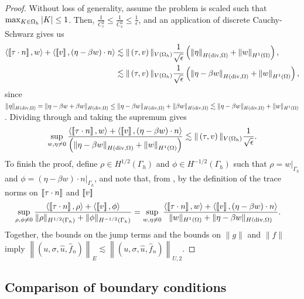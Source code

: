 \begin{proof}
Without loss of generality, assume the problem is scaled such that $\max_{K\in\Oh}|K| \leq 1$. Then, $\frac{1}{C_\tau^2}\leq \frac{1}{C_v^2} \leq \frac{1}{\epsilon}$, and an application of discrete Cauchy-Schwarz gives us 
\begin{align*}
\langle \jump{\tau\cdot n},w\rangle + \langle \jump{v},\left(\eta - \beta w\right)\cdot n\rangle &\lesssim \|\left(\tau,v\right)\|_{V(\Oh)}\frac{1}{\sqrt{\epsilon}}\left(\nor{\eta}_{H({\rm div},\Omega)} + \nor{w}_{H^1(\Omega)}\right),\\
&\lesssim \|\left(\tau,v\right)\|_{V(\Oh)}\frac{1}{\sqrt{\epsilon}}\left(\nor{\eta-\beta w}_{H({\rm div},\Omega)} + \nor{w}_{H^1(\Omega)}\right),
\end{align*}
since $\|\eta\|_{H({\rm div},\Omega)} = \|\eta - \beta w + \beta w\|_{H({\rm div},\Omega)} \leq \|\eta - \beta w\|_{H({\rm div},\Omega)} + \|\beta w\|_{H({\rm div},\Omega)} \lesssim \|\eta-\beta w\|_{H({\rm div},\Omega)} + \|w\|_{H^1(\Omega)}$.  Dividing through and taking the supremum gives
\[
\sup_{w,\eta \neq 0} \frac{\langle\jump{\tau\cdot n},w\rangle + \langle \jump{v},\left(\eta - \beta w\right)\cdot n\rangle}{\left(\nor{\eta-\beta w}_{H({\rm div},\Omega)} + \nor{w}_{H^1(\Omega)}\right)} \lesssim \|\left(\tau,v\right)\|_{V(\Oh)}\frac{1}{\sqrt{\epsilon}}.
\]
To finish the proof, define $\rho \in H^{1/2}(\Gamma_h)$ and $\phi \in H^{-1/2}(\Gamma_h)$ such that $\rho = \left.w\right|_{\Gamma_h}$ and $\phi = \left.(\eta-\beta w)\cdot n\right|_{\Gamma_h}$, and note that, from \cite{analysisDPG}, by the definition of the trace norms on $\jump{\tau\cdot n}$ and $\jump{v}$ 
\begin{align*}
\sup_{\rho,\phi \neq 0} \frac{\langle \jump{\tau\cdot n},\rho\rangle + \langle \jump{v},\phi \rangle}{\|\rho\|_{H^{1/2}(\Gamma_h)}+\|\phi\|_{H^{-1/2}(\Gamma_h)}} &= \sup_{w,\eta \neq 0} \frac{\langle \jump{\tau\cdot n},w\rangle + \langle \jump{v},\left(\eta - \beta w\right)\cdot n\rangle}{ \|w\|_{H^1(\Omega)}+\|\eta-\beta w\|_{H({\rm div},\Omega)}}.
\end{align*}
Together, the bounds on the jump terms and the bounds on $\|g\|$ and $\|f\|$ imply $\left\|\left(u,\sigma,\widehat{u},\widehat{f}_n\right)\right\|_{E} \lesssim \left\|\left(u,\sigma,\widehat{u},\widehat{f}_n\right)\right\|_{U,2}$.
\end{proof}

\subsection{Comparison of boundary conditions}

